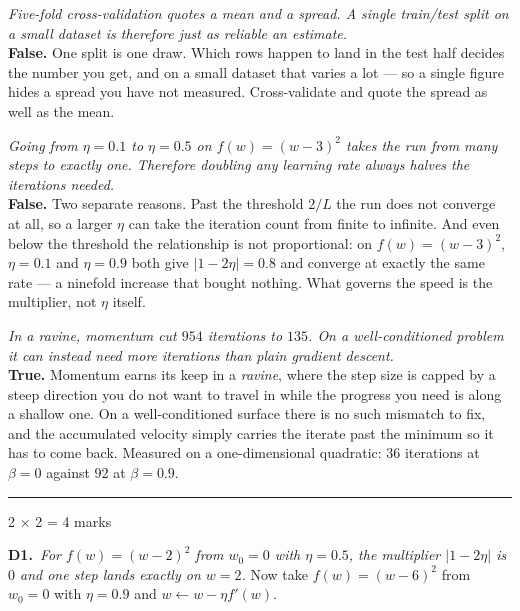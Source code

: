 \documentclass[10pt,a4paper]{article}
\newcommand{\parthead}[2]{\vspace{2pt}\noindent\rule{\linewidth}{0.4pt}\par\vspace{2pt}%
  \noindent{\bfseries Part #1}\hfill{\small #2}\par\vspace{1pt}}
\begin{document}
\begin{sC}

  \item \emph{\emph{Five-fold cross-validation quotes a mean and a spread.} A single train/test split on a small dataset is therefore just as reliable an estimate.}\\[2pt] \textbf{False.} One split is one draw. Which rows happen to land in the test half decides the number you get, and on a small dataset that varies a lot --- so a single figure hides a spread you have not measured. Cross-validate and quote the spread as well as the mean.

  \item \emph{\emph{Going from $\eta = 0.1$ to $\eta = 0.5$ on $f(w) = (w-3)^2$ takes the run from many steps to exactly one.} Therefore doubling any learning rate always halves the iterations needed.}\\[2pt] \textbf{False.} Two separate reasons. Past the threshold $2/L$ the run does not converge at all, so a larger $\eta$ can take the iteration count from finite to infinite. And even below the threshold the relationship is not proportional: on $f(w) = (w-3)^2$, $\eta = 0.1$ and $\eta = 0.9$ both give $\lvert 1 - 2\eta \rvert = 0.8$ and converge at exactly the same rate --- a ninefold increase that bought nothing. What governs the speed is the multiplier, not $\eta$ itself.

  \item \emph{\emph{In a ravine, momentum cut $954$ iterations to $135$.} On a well-conditioned problem it can instead need more iterations than plain gradient descent.}\\[2pt] \textbf{True.} Momentum earns its keep in a \emph{ravine}, where the step size is capped by a steep direction you do not want to travel in while the progress you need is along a shallow one. On a well-conditioned surface there is no such mismatch to fix, and the accumulated velocity simply carries the iterate past the minimum so it has to come back. Measured on a one-dimensional quadratic: $36$ iterations at $\beta = 0$ against $92$ at $\beta = 0.9$.

\end{sC}

\newpage

\parthead{D --- Short answer}{2 $\times$ 2 = 4 marks}

\textbf{D1.}\ \emph{For $f(w) = (w-2)^2$ from $w_0 = 0$ with $\eta = 0.5$, the multiplier $\lvert 1 - 2\eta \rvert$ is $0$ and one step lands exactly on $w = 2$.} Now take $f(w) = (w-6)^2$ from $w_0 = 0$ with $\eta = 0.9$ and $w \leftarrow w - \eta f'(w)$.
\end{document}

